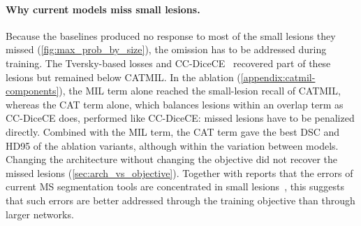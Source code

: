 \paragraph{Why current models miss small lesions.}
Because the baselines produced no response to most of the small lesions
they missed (\cref{fig:max_prob_by_size}), the omission has to be addressed
during training. The
Tversky-based losses and CC-DiceCE~\cite{bouteille_learning_2026}
recovered part of these lesions but remained below CATMIL. In the ablation
(\cref{appendix:catmil-components}), the MIL term alone reached the
small-lesion recall of CATMIL, whereas the CAT term alone, which balances
lesions within an overlap term as CC-DiceCE does, performed like
CC-DiceCE: missed lesions have to be penalized directly. Combined with the
MIL term, the CAT term gave the best DSC and HD95 of the ablation variants,
although within the variation between models. Changing the architecture
without changing the objective did not recover the missed lesions
(\cref{sec:arch_vs_objective}). Together
with reports that the errors of current MS segmentation tools are
concentrated in small lesions~\cite{dereskewicz_flames_2025}, this suggests
that such errors are better addressed through the training objective than
through larger networks.

